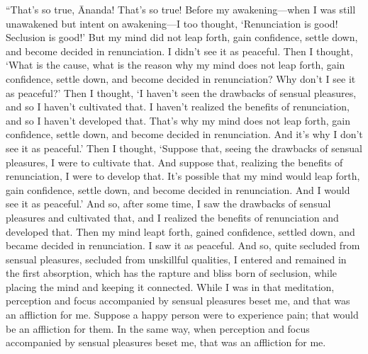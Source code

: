 \documentclass[12pt,openany]{book}%
\begin{document}
“That’s so true, Ānanda! That’s so true! Before my awakening—when I was still unawakened but intent on awakening—I too thought, ‘Renunciation is good! Seclusion is good!’ But my mind did not leap forth, gain confidence, settle down, and become decided in renunciation. I didn’t see it as peaceful. Then I thought, ‘What is the cause, what is the reason why my mind does not leap forth, gain confidence, settle down, and become decided in renunciation? Why don’t I see it as peaceful?’ Then I thought, ‘I haven’t seen the drawbacks of sensual pleasures, and so I haven’t cultivated that. I haven’t realized the benefits of renunciation, and so I haven’t developed that. That’s why my mind does not leap forth, gain confidence, settle down, and become decided in renunciation. And it’s why I don’t see it as peaceful.’ Then I thought, ‘Suppose that, seeing the drawbacks of sensual pleasures, I were to cultivate that. And suppose that, realizing the benefits of renunciation, I were to develop that. It’s possible that my mind would leap forth, gain confidence, settle down, and become decided in renunciation. And I would see it as peaceful.’ And so, after some time, I saw the drawbacks of sensual pleasures and cultivated that, and I realized the benefits of renunciation and developed that. Then my mind leapt forth, gained confidence, settled down, and became decided in renunciation. I saw it as peaceful. And so, quite secluded from sensual pleasures, secluded from unskillful qualities, I entered and remained in the first absorption, which has the rapture and bliss born of seclusion, while placing the mind and keeping it connected. While I was in that meditation, perception and focus accompanied by sensual pleasures beset me, and that was an affliction for me. Suppose a happy person were to experience pain; that would be an affliction for them. In the same way, when perception and focus accompanied by sensual pleasures beset me, that was an affliction for me. 
\end{document}
